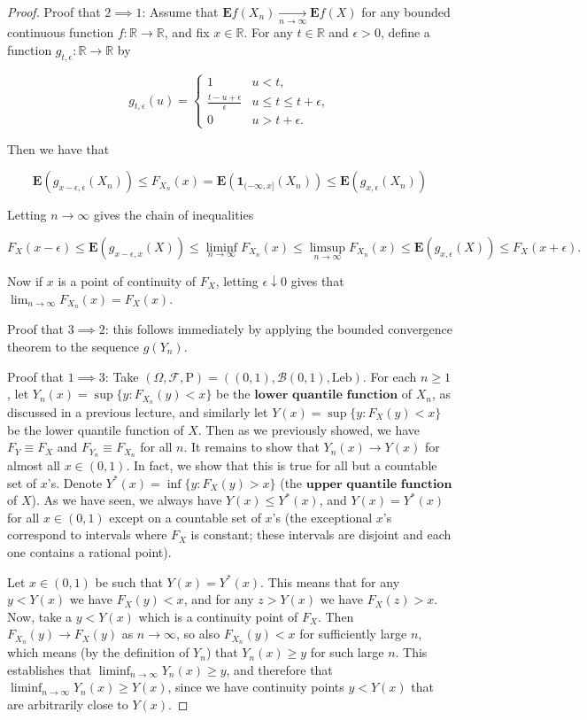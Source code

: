 \documentclass[11pt]{report}
\providecommand{\cal}{\mathcal}
\newcommand{\R}{\mathbb{R}}
\theoremstyle{plain}
\theoremstyle{definition}
\begin{document}
\begin{proof}
Proof that $2\implies 1$: Assume that
$\mathbf{E} f(X_n) \xrightarrow[n\to\infty]{}
\mathbf{E} f(X)$
for any bounded continuous function $f:\R\to\R$, and
fix $x\in \R$. For any $t\in \R$ and $\epsilon>0$,
define a function $g_{t,\epsilon}:\R\to\R$ by

\[
g_{t,\epsilon}(u) = \begin{cases}
1 & u<t, \\
\frac{t-u+\epsilon}{\epsilon} & u \le t \le t+\epsilon, \\
0 & u>t+\epsilon.
\end{cases}
\]

\noindent Then we have that

\[
\mathbf{E} (g_{x-\epsilon,\epsilon}(X_n)) \le F_{X_n}(x) = \mathbf{E}(\mathbf{1}_{(-\infty,x]}(X_n)) \le \mathbf{E}(g_{x,\epsilon}(X_n))
\]

\noindent Letting $n\to\infty$ gives the chain of inequalities

\[
F_{X}(x-\epsilon) \le \mathbf{E}(g_{x-\epsilon,x}(X)) \le \liminf_{n\to\infty} F_{X_n}(x) \le \limsup_{n\to\infty}
F_{X_n}(x) \le \mathbf{E}(g_{x,\epsilon}(X)) \le F_X(x+\epsilon).
\]

\noindent Now if $x$ is a point of continuity of $F_X$, letting
$\epsilon \downarrow 0$ gives that
$\lim_{n\to\infty}F_{X_n}(x) = F_X(x)$.

Proof that $3\implies 2$: this follows immediately by
applying the bounded convergence theorem to the
sequence $g(Y_n)$.

Proof that $1 \implies 3$: Take
$(\Omega,{\cal F},\mathrm{P}) = ((0,1),{\cal B}(0,1),
\textrm{Leb})$.
For each $n\ge 1$, let
$Y_n(x) = \sup\{ y : F_{X_n}(y) < x \}$ be the
$\textbf{lower quantile function}$ of $X_n$, as
discussed in a previous lecture, and similarly let
$Y(x)=\sup\{ y : F_X(y)<x\}$ be the lower quantile
function of $X$. Then as we previously showed, we
have $F_Y \equiv F_X$ and $F_{Y_n}\equiv F_{X_n}$ for
all $n$. It remains to show that $Y_n(x)\to Y(x)$ for
almost all $x\in(0,1)$. In fact, we show that this is
true for all but a countable set of $x$'s. Denote
$Y^*(x) = \inf\{ y : F_X(y)>x\}$ (the
$\textbf{upper quantile function}$ of $X$). As we
have seen, we always have $Y(x) \le Y^*(x)$, and
$Y(x) = Y^*(x)$ for all $x\in(0,1)$ except on a
countable set of $x$'s (the exceptional $x$'s
correspond to intervals where $F_X$ is constant;
these intervals are disjoint and each one contains a
rational point).

Let $x\in(0,1)$ be such that $Y(x)=Y^*(x)$. This
means that for any $y<Y(x)$ we have $F_X(y)<x$, and
for any $z>Y(x)$ we have $F_X(z)>x$. Now, take a
$y<Y(x)$ which is a continuity point of $F_X$. Then
$F_{X_n}(y)\to F_X(y)$ as $n\to\infty$, so also
$F_{X_n}(y)< x$ for sufficiently large $n$, which
means (by the definition of $Y_n$) that $Y_n(x)\ge y$
for such large $n$. This establishes that
$\liminf_{n\to\infty} Y_n(x)\ge y$, and therefore
that $\liminf_{n\to\infty} Y_n(x)\ge Y(x)$, since we
have continuity points $y<Y(x)$ that are arbitrarily
close to $Y(x)$.


\end{proof}
\end{document}
